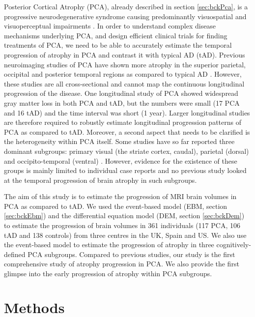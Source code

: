 Posterior Cortical Atrophy (PCA), already described in section \ref{sec:bckPca}, is a progressive neurodegenerative syndrome causing predominantly visuospatial and visuoperceptual impairments \cite{crutch2012posterior}. In order to understand complex disease mechanisms underlying PCA, and design efficient clinical trials for finding treatments of PCA, we need to be able to accurately estimate the temporal progression of atrophy in PCA and contrast it with typical AD (tAD). Previous neuroimaging studies of PCA have shown more atrophy in the superior parietal, occipital and posterior temporal regions as compared to typical AD \cite{lehmann2011cortical, whitwell2007imaging}. However, these studies are all cross-sectional and cannot map the continuous longitudinal progression of the disease. One longitudinal study of PCA \cite{lehmann2012global} showed widespread gray matter loss in both PCA and tAD, but the numbers were small (17 PCA and 16 tAD) and the time interval was short (1 year). Larger longitudinal studies are therefore required to robustly estimate longitudinal progression patterns of PCA as compared to tAD. Moreover, a second aspect that needs to be clarified is the heterogeneity within PCA itself. Some studies have so far reported three dominant subgroups: primary visual (the striate cortex, caudal), parietal (dorsal) and occipito-temporal (ventral) \cite{ross1996progressive,galton2000atypical}. However, evidence for the existence of these groups is mainly limited to individual case reports \cite{ross1996progressive,galton2000atypical} and no previous study looked at the temporal progression of brain atrophy in such subgroups.

The aim of this study is to estimate the progression of MRI brain volumes in PCA as compared to tAD. We used the event-based model (EBM, section \ref{sec:bckEbm}) and the differential equation model (DEM, section \ref{sec:bckDem}) to estimate the progression of brain volumes in 361 individuals (117 PCA, 106 tAD and 138 controls) from three centres in the UK, Spain and US. We also use the event-based model to estimate the progression of atrophy in three cognitively-defined PCA subgroups. Compared to previous studies, our study is the first comprehensive study of atrophy progression in PCA. We also provide the first glimpse into the early progression of atrophy within PCA subgroups. 


\section{Methods}

